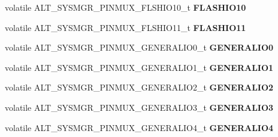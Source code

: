 \begin{DoxyCompactItemize}
\item 
\mbox{\label{structALT__SYSMGR__PINMUX__s_a616018a5a37154b45c44310175199acf}} 
volatile A\+L\+T\+\_\+\+S\+Y\+S\+M\+G\+R\+\_\+\+P\+I\+N\+M\+U\+X\+\_\+\+F\+L\+S\+H\+I\+O10\+\_\+t {\bfseries F\+L\+A\+S\+H\+I\+O10}
\item 
\mbox{\label{structALT__SYSMGR__PINMUX__s_a13d73ca0fd79d1ceff79d5f4ac6a0b58}} 
volatile A\+L\+T\+\_\+\+S\+Y\+S\+M\+G\+R\+\_\+\+P\+I\+N\+M\+U\+X\+\_\+\+F\+L\+S\+H\+I\+O11\+\_\+t {\bfseries F\+L\+A\+S\+H\+I\+O11}
\item 
\mbox{\label{structALT__SYSMGR__PINMUX__s_af46ab6583c746ff3504a9cc46aed05f9}} 
volatile A\+L\+T\+\_\+\+S\+Y\+S\+M\+G\+R\+\_\+\+P\+I\+N\+M\+U\+X\+\_\+\+G\+E\+N\+E\+R\+A\+L\+I\+O0\+\_\+t {\bfseries G\+E\+N\+E\+R\+A\+L\+I\+O0}
\item 
\mbox{\label{structALT__SYSMGR__PINMUX__s_a826e954dcbf97d6ee1faf44a29075246}} 
volatile A\+L\+T\+\_\+\+S\+Y\+S\+M\+G\+R\+\_\+\+P\+I\+N\+M\+U\+X\+\_\+\+G\+E\+N\+E\+R\+A\+L\+I\+O1\+\_\+t {\bfseries G\+E\+N\+E\+R\+A\+L\+I\+O1}
\item 
\mbox{\label{structALT__SYSMGR__PINMUX__s_a4059bbdee58a7fc2bf571a0da08e7a7d}} 
volatile A\+L\+T\+\_\+\+S\+Y\+S\+M\+G\+R\+\_\+\+P\+I\+N\+M\+U\+X\+\_\+\+G\+E\+N\+E\+R\+A\+L\+I\+O2\+\_\+t {\bfseries G\+E\+N\+E\+R\+A\+L\+I\+O2}
\item 
\mbox{\label{structALT__SYSMGR__PINMUX__s_a890f6ff3babc0889fc4379f4c62a6b1c}} 
volatile A\+L\+T\+\_\+\+S\+Y\+S\+M\+G\+R\+\_\+\+P\+I\+N\+M\+U\+X\+\_\+\+G\+E\+N\+E\+R\+A\+L\+I\+O3\+\_\+t {\bfseries G\+E\+N\+E\+R\+A\+L\+I\+O3}
\item 
\mbox{\label{structALT__SYSMGR__PINMUX__s_aa781b81ec85c2e46fa609d300ee34929}} 
volatile A\+L\+T\+\_\+\+S\+Y\+S\+M\+G\+R\+\_\+\+P\+I\+N\+M\+U\+X\+\_\+\+G\+E\+N\+E\+R\+A\+L\+I\+O4\+\_\+t {\bfseries G\+E\+N\+E\+R\+A\+L\+I\+O4}
\item 
\mbox{\label{structALT__SYSMGR__PINMUX__s_a47ce2456053f505241b823b71bb8946c}} 

\end{DoxyCompactItemize}
